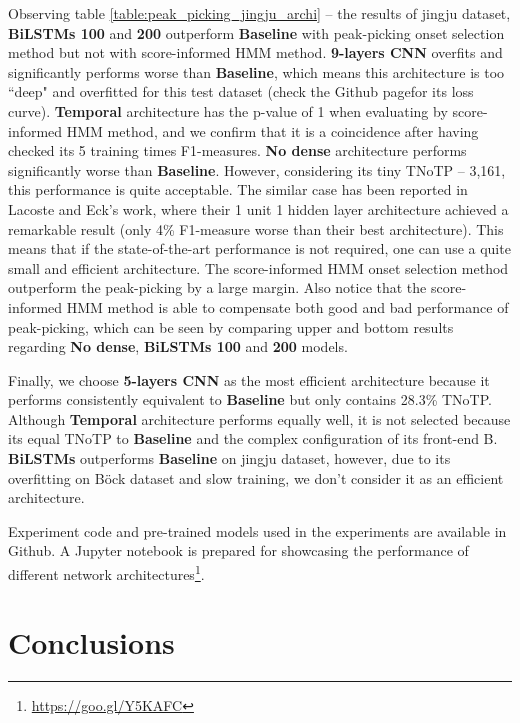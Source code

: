 Observing table \ref{table:peak_picking_jingju_archi} -- the results of jingju dataset, \textbf{BiLSTMs 100} and \textbf{200} outperform \textbf{Baseline} with peak-picking onset selection method but not with score-informed HMM method. \textbf{9-layers CNN} overfits and significantly performs worse than \textbf{Baseline}, which means this architecture is too ``deep" and overfitted for this test dataset (check the Github page for its loss curve). \textbf{Temporal} architecture has the p-value of 1 when evaluating by score-informed HMM method, and we confirm that it is a coincidence after having checked its 5 training times F1-measures. \textbf{No dense} architecture performs significantly worse than \textbf{Baseline}. However, considering its tiny TNoTP -- 3,161, this performance is quite acceptable. The similar case has been reported in Lacoste and Eck's work\cite{Lacoste2007a}, where their 1 unit 1 hidden layer architecture achieved a remarkable result (only 4\% F1-measure worse than their best architecture). This means that if the state-of-the-art performance is not required, one can use a quite small and efficient architecture. The score-informed HMM onset selection method outperform the peak-picking by a large margin. Also notice that the score-informed HMM method is able to compensate both good and bad performance of peak-picking, which can be seen by comparing upper and bottom results regarding \textbf{No dense}, \textbf{BiLSTMs 100} and \textbf{200} models.

Finally, we choose \textbf{5-layers CNN} as the most efficient architecture because it performs consistently equivalent to \textbf{Baseline} but only contains 28.3\% TNoTP. Although \textbf{Temporal} architecture performs equally well, it is not selected because its equal TNoTP to \textbf{Baseline} and the complex configuration of its front-end B. \textbf{BiLSTMs} outperforms \textbf{Baseline} on jingju dataset, however, due to its overfitting on B\"{o}ck dataset and slow training, we don't consider it as an efficient architecture.

Experiment code
and pre-trained models used in the experiments are available in Github. A Jupyter notebook is prepared for showcasing the performance of different network architectures\footnote{\url{https://goo.gl/Y5KAFC}}. 

\section{Conclusions}

